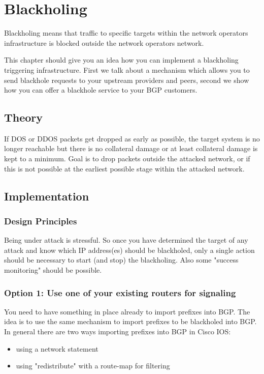 \section{Blackholing}
Blackholing means that traffic to specific targets within the network operators infrastructure is blocked outside the network operators network.

This chapter should give you an idea how you can implement a blackholing triggering infrastructure. First we talk about a mechanism which allows you to send blackhole requests to your upstream providers and peers, second we show how you can offer a blackhole service to your BGP customers.

\subsection{Theory}
If DOS or DDOS packets get dropped as early as possible, the target system is no longer reachable but there is no collateral damage or at least collateral damage is kept to a minimum. Goal is to drop packets outside the attacked network, or if this is not possible at the earliest possible stage within the attacked network.

\subsection{Implementation}
\subsubsection{Design Principles}
Being under attack is stressful. So once you have determined the target of any attack and know which IP address(es) should be blackholed, only a single action should be necessary to start (and stop) the blackholing. Also some "success monitoring" should be possible.

\subsubsection{Option 1: Use one of your existing routers for signaling}
You need to have something in place already to import prefixes into BGP. The idea is to use the same mechanism to import prefixes to be blackholed into BGP. In general there are two ways importing prefixes into BGP in Cisco IOS:
\begin{itemize}
  \item using a network statement
  \item using "redistribute" with a route-map for filtering
\end{itemize}

